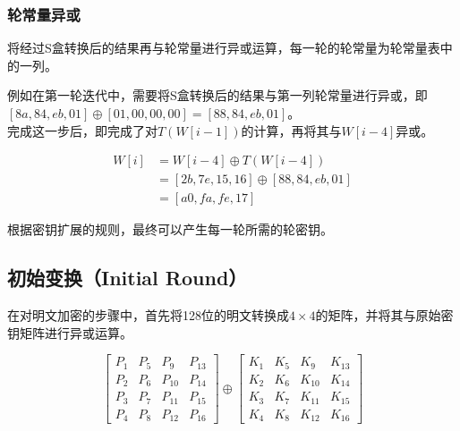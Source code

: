 \subsubsection{轮常量异或}

将经过S盒转换后的结果再与轮常量进行异或运算，每一轮的轮常量为轮常量表中的一列。\\

\begin{table}[H]
    \centering
    \caption{轮常量}
\end{table}

例如在第一轮迭代中，需要将S盒转换后的结果与第一列轮常量进行异或，即$ [8a, 84, eb, 01] \oplus [01, 00, 00, 00] = [88, 84, eb, 01] $。\\

完成这一步后，即完成了对$ T(W[i-1]) $的计算，再将其与$ W[i-4] $异或。

\vspace{-1cm}

\begin{align*}
    W[i] & = W[i-4] \oplus T(W[i-4])                  \\
         & = [2b, 7e, 15, 16] \oplus [88, 84, eb, 01] \\
         & = [a0, fa, fe, 17]
\end{align*}

根据密钥扩展的规则，最终可以产生每一轮所需的轮密钥。\\

\subsection{初始变换（Initial Round）}

在对明文加密的步骤中，首先将128位的明文转换成$ 4 \times 4 $的矩阵，并将其与原始密钥矩阵进行异或运算。

$$
    \begin{bmatrix}
        P_1 & P_5 & P_9  & P_13 \\
        P_2 & P_6 & P_10 & P_14 \\
        P_3 & P_7 & P_11 & P_15 \\
        P_4 & P_8 & P_12 & P_16
    \end{bmatrix}
    \oplus
    \begin{bmatrix}
        K_1 & K_5 & K_9  & K_13 \\
        K_2 & K_6 & K_10 & K_14 \\
        K_3 & K_7 & K_11 & K_15 \\
        K_4 & K_8 & K_12 & K_16
    \end{bmatrix}
$$

